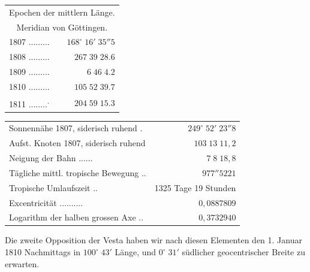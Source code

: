 \begin{center}\fontsize{10}{12}\selectfont\setlength{\tabcolsep}{5pt}\renewcommand{\arraystretch}{1.15}\begin{tabular}{lr}
\multicolumn{2}{c}{Epochen der mittlern Länge.}\\
\multicolumn{2}{c}{Meridian von Göttingen.}\\
1807 .\;.\;.\;.\;.\;.\;.\;.\;.\; & $168^\circ\;16'\;35''5$\\
1808 .\;.\;.\;.\;.\;.\;.\;.\;.\; & $267\;39\;28.6$\\
1809 .\;.\;.\;.\;.\;.\;.\;.\;.\; & $6\;46\;4.2$\\
1810 .\;.\;.\;.\;.\;.\;.\;.\;.\; & $105\;52\;39.7$\\
1811 .\;.\;.\;.\;.\;.\;.\;.\;\textsuperscript{.}\; & $204\;59\;15.3$\\
\end{tabular}\end{center}

\begin{center}\fontsize{9}{11}\selectfont\setlength{\tabcolsep}{5pt}\renewcommand{\arraystretch}{1.15}\begin{tabular}{lr}

Sonnennähe 1807, siderisch ruhend .\; & $249^\circ\;52'\;23''8$\\
Aufst. Knoten 1807, siderisch ruhend  & $103\;13\;11{,}2$\\
Neigung der Bahn .\;.\;.\;.\;.\;.\; & $7\;8\;18{,}8$\\
Tägliche mittl. tropische Bewegung .\;.\; & $977''5221$\\
Tropische Umlaufszeit .\;.\; & 1325 Tage 19 Stunden\\
Excentricität .\;.\;.\;.\;.\;.\;.\;.\;.\;.\; & $0{,}0887809$\\
Logarithm der halben grossen Axe .\;.\; & $0{,}3732940$\\
\end{tabular}\end{center}


\par\indent Die zweite Opposition der Vesta haben wir nach diesen Elementen den 1. Januar 1810 Nachmittags in $100^\circ\;43'$ Länge, und $0^\circ\;31'$ südlicher geocentrischer Breite zu erwarten.

